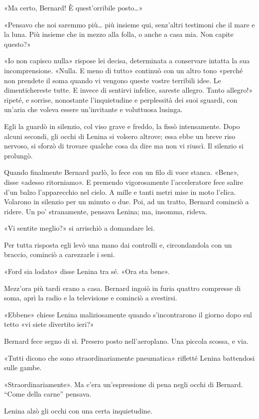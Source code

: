 \documentclass[
a5paper, %
10pt, %
twoside, 
onecolumn, %
openany, %
]{memoir}
\begin{document}
«Ma certo, Bernard! È quest’orribile posto…»

«Pensavo che noi saremmo più… più insieme qui, senz’altri testimoni che il mare e la luna. Più insieme che in mezzo alla folla, o anche a casa mia. Non capite questo?»

«Io non capisco nulla» rispose lei decisa, determinata a conservare intatta la sua incomprensione. «Nulla. E meno di tutto» continuò con un altro tono «perché non prendete il soma quando vi vengono queste vostre terribili idee. Le dimentichereste tutte. E invece di sentirvi infelice, sareste allegro. Tanto allegro!» ripeté, e sorrise, nonostante l’inquietudine e perplessità dei suoi sguardi, con un’aria che voleva essere un’invitante e voluttuosa lusinga.

Egli la guardò in silenzio, col viso grave e freddo, la fissò intensamente. Dopo alcuni secondi, gli occhi di Lenina si volsero altrove; essa ebbe un breve riso nervoso, si sforzò di trovare qualche cosa da dire ma non vi riuscì. Il silenzio si prolungò.

Quando finalmente Bernard parlò, lo fece con un filo di voce stanca. «Bene», disse «adesso ritorniamo». E premendo vigorosamente l’acceleratore fece salire d’un balzo l’apparecchio nel cielo. A mille e tanti metri mise in moto l’elica. Volarono in silenzio per un minuto o due. Poi, ad un tratto, Bernard cominciò a ridere. Un po’ stranamente, pensava Lenina; ma, insomma, rideva.

«Vi sentite meglio?» si arrischiò a domandare lei.

Per tutta risposta egli levò una mano dai controlli e, circondandola con un braccio, cominciò a carezzarle i seni.

«Ford sia lodato» disse Lenina tra sé. «Ora sta bene».

Mezz’ora più tardi erano a casa. Bernard ingoiò in furia quattro compresse di soma, aprì la radio e la televisione e cominciò a svestirsi.

«Ebbene» chiese Lenina maliziosamente quando s’incontrarono il giorno dopo sul tetto «vi siete divertito ieri?»

Bernard fece segno di sì. Presero posto nell’aeroplano. Una piccola scossa, e via.

«Tutti dicono che sono straordinariamente pneumatica» rifletté Lenina battendosi sulle gambe.

«Straordinariamente». Ma c’era un’espressione di pena negli occhi di Bernard. “Come della carne” pensava.

Lenina alzò gli occhi con una certa inquietudine.
\end{document}
